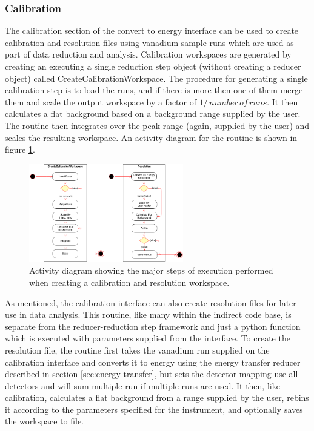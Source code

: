 \documentclass[paper=a4, fontsize=11pt]{scrartcl}	%
\numberwithin{equation}{section}															%
\numberwithin{figure}{section}																%
\numberwithin{table}{section}																%
\begin{document}
\subsubsection{Calibration}
\label{subsec:c2e-calibration}
The calibration section of the convert to energy interface can be used to create calibration and resolution files using vanadium sample runs which are used as part of data reduction and analysis. Calibration workspaces are generated by creating an executing a single reduction step object  (without creating a reducer object) called CreateCalibrationWorkspace. The procedure for generating a single calibration step is to load the runs, and if there is more then one of them merge them and scale the output workspace by a factor of $1/\,number\,of\,runs$. It then calculates a flat background based on a background range supplied by the user. The routine then integrates over the peak range (again, supplied by the user) and scales the resulting workspace. An activity diagram for the routine is shown in figure \ref{fig:c2e-calibration-activity-diagram}.

\begin{figure}[H]
\centering
\includegraphics[width=0.6\textwidth]{img/uml/activity_diagrams/Calibration_activity.png}
\caption{Activity diagram showing the major steps of execution performed when creating a calibration and resolution workspace.}
\label{fig:c2e-calibration-activity-diagram}
\end{figure}

As mentioned, the calibration interface can also create resolution files for later use in data analysis. This routine, like many within the indirect code base, is separate from the reducer-reduction step  framework and just a python function which is executed with parameters supplied from the interface. To create the resolution file, the routine first takes the vanadium run supplied on the calibration interface and converts it to energy using the energy transfer reducer described in section \ref{sec:energy-transfer}, but sets the detector mapping use all detectors and will sum multiple run if multiple runs are used. It then, like calibration, calculates a flat background from a range supplied by the user, rebins it according to the parameters specified for the instrument, and optionally saves the workspace to file.
\end{document}
